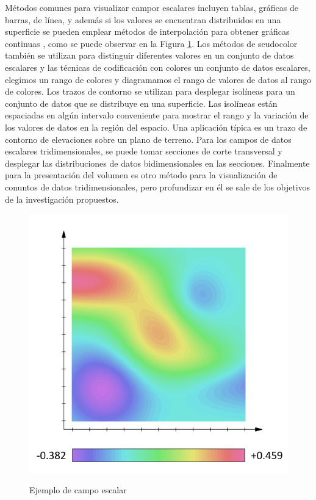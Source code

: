 \documentclass[11pt,letterpaper]{article}     %
\begin{document}
M\' etodos comunes para visualizar campor escalares incluyen tablas, gr\' aficas de barras, de l\' inea, y adem\' as si los valores se encuentran distribuidos en una superficie se pueden emplear m\' etodos de interpolaci\' on para obtener gr\' aficas continuas
\cite{Donald Hearn y M. Pauline Baker}, como se puede observar en la Figura \ref{fig:scalarfield}.
Los m\' etodos de seudocolor tambi\' en se utilizan para distinguir diferentes valores en un conjunto de datos escalares y las t\' ecnicas de codificaci\'  on con colores un conjunto de datos escalares, elegimos un rango de colores y diagramamos el rango de valores de datos al rango de colores.
Los trazos de contorno se utilizan para desplegar isol\' ineas para un conjunto de datos que se distribuye en una superficie. Las isol\'  ineas est\'  an espaciadas en alg\'  un intervalo conveniente para mostrar el rango y la variaci\'  on de los valores de datos en la regi\'  on del espacio. Una aplicaci\'  on t\'  ipica es un trazo de contorno de elevaciones sobre un plano de terreno.
Para los campos de datos escalares tridimensionales, se puede tomar secciones de corte transversal y desplegar las distribuciones de datos bidimensionales en las secciones.  Finalmente para la presentaci\' on del volumen es otro m\' etodo para la visualizaci\'  on de conuntos de datos tridimensionales, pero profundizar en \' el se sale de los objetivos de la investigaci\' on propuestos.

\begin{figure}[hbtp]
\caption{Ejemplo de campo escalar}
\includegraphics[scale=0.4]{imagenes/Scalar_field.png}
\label{fig:scalarfield}
\end{figure}
\end{document}
